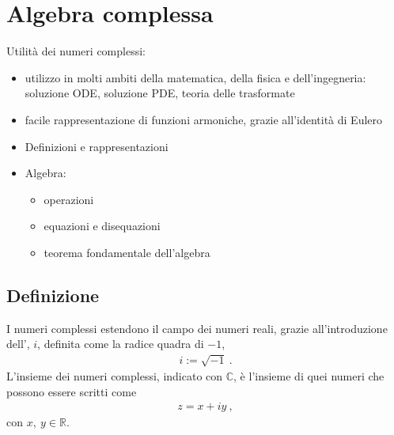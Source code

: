 \documentclass[letterpaper,10pt,english]{jupyterBook}
\begin{document}
\chapter{Algebra complessa}
\label{\detokenize{ch/algebra/complex-algebra:algebra-complessa}}\label{\detokenize{ch/algebra/complex-algebra:math-hs-algebra-complex}}\label{\detokenize{ch/algebra/complex-algebra::doc}}
\sphinxAtStartPar
Utilità dei numeri complessi:
\begin{itemize}
\item {} 
\sphinxAtStartPar
utilizzo in molti ambiti della matematica, della fisica e dell’ingegneria: soluzione ODE, soluzione PDE, teoria delle trasformate

\item {} 
\sphinxAtStartPar
facile rappresentazione di funzioni armoniche, grazie all’identità di Eulero

\end{itemize}

\sphinxAtStartPar
{}
\begin{itemize}
\item {} 
\sphinxAtStartPar
Definizioni e rappresentazioni

\item {} 
\sphinxAtStartPar
Algebra:
\begin{itemize}
\item {} 
\sphinxAtStartPar
operazioni

\item {} 
\sphinxAtStartPar
equazioni e disequazioni

\item {} 
\sphinxAtStartPar
teorema fondamentale dell’algebra

\end{itemize}

\end{itemize}


\section{Definizione}
\label{\detokenize{ch/algebra/complex-algebra:definizione}}
\sphinxAtStartPar
I numeri complessi estendono il campo dei numeri reali, grazie all’introduzione dell’, \(i\), definita come la radice quadra di \(-1\),
\begin{equation*}
\begin{split}i := \sqrt{-1} \ .\end{split}
\end{equation*}
\sphinxAtStartPar
L’insieme dei numeri complessi, indicato con \(\mathbb{C}\), è l’insieme di quei numeri che possono essere scritti come
\begin{equation*}
\begin{split}z = x + i y \ ,\end{split}
\end{equation*}
\sphinxAtStartPar
con \(x, \ y \in \mathbb{R}\).
\end{document}
